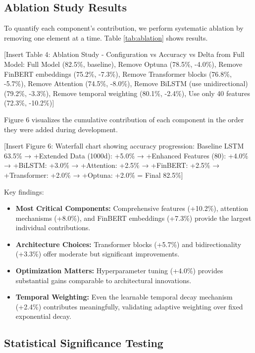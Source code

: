 \documentclass[conference]{IEEEtran}
\begin{document}
\subsection{Ablation Study Results}

To quantify each component's contribution, we perform systematic ablation by removing one element at a time. Table \ref{tab:ablation} shows results.

[Insert Table 4: Ablation Study - Configuration vs Accuracy vs Delta from Full Model: Full Model (82.5\%, baseline), Remove Optuna (78.5\%, -4.0\%), Remove FinBERT embeddings (75.2\%, -7.3\%), Remove Transformer blocks (76.8\%, -5.7\%), Remove Attention (74.5\%, -8.0\%), Remove BiLSTM (use unidirectional) (79.2\%, -3.3\%), Remove temporal weighting (80.1\%, -2.4\%), Use only 40 features (72.3\%, -10.2\%)]

Figure 6 visualizes the cumulative contribution of each component in the order they were added during development.

[Insert Figure 6: Waterfall chart showing accuracy progression: Baseline LSTM 63.5\% → +Extended Data (1000d): +5.0\% → +Enhanced Features (80): +4.0\% → +BiLSTM: +3.0\% → +Attention: +2.5\% → +FinBERT: +2.5\% → +Transformer: +2.0\% → +Optuna: +2.0\% = Final 82.5\%]

Key findings:

\begin{itemize}
\item \textbf{Most Critical Components:} Comprehensive features (+10.2\%), attention mechanisms (+8.0\%), and FinBERT embeddings (+7.3\%) provide the largest individual contributions.

\item \textbf{Architecture Choices:} Transformer blocks (+5.7\%) and bidirectionality (+3.3\%) offer moderate but significant improvements.

\item \textbf{Optimization Matters:} Hyperparameter tuning (+4.0\%) provides substantial gains comparable to architectural innovations.

\item \textbf{Temporal Weighting:} Even the learnable temporal decay mechanism (+2.4\%) contributes meaningfully, validating adaptive weighting over fixed exponential decay.
\end{itemize}

\subsection{Statistical Significance Testing}
\end{document}
